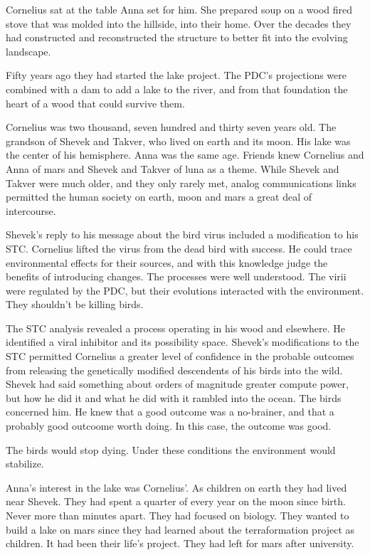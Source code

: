 Cornelius sat at the table Anna set for him.  She prepared soup on a
wood fired stove that was molded into the hillside, into their home.
Over the decades they had constructed and reconstructed the structure
to better fit into the evolving landscape.  

Fifty years ago they had started the lake project.  The PDC's projections
were combined with a dam to add a lake to the river, and from that
foundation the heart of a wood that could survive them.

\bigskip

Cornelius was two thousand, seven hundred and thirty seven years old.
The grandson of Shevek and Takver, who lived on earth and its moon.
His lake was the center of his hemisphere.  Anna was the same age.
Friends knew Cornelius and Anna of mars and Shevek and Takver of luna
as a theme.  While Shevek and Takver were much older, and they only
rarely met, analog communications links permitted the human society on
earth, moon and mars a great deal of intercourse.

\bigskip

Shevek's reply to his message about the bird virus included a
modification to his STC.  Cornelius lifted the virus from the dead
bird with success.  He could trace environmental effects for their
sources, and with this knowledge judge the benefits of introducing
changes.  The processes were well understood.  The virii were
regulated by the PDC, but their evolutions interacted with the
environment.  They shouldn't be killing birds.

The STC analysis revealed a process operating in his wood and
elsewhere.  He identified a viral inhibitor and its possibility space.
Shevek's modifications to the STC permitted Cornelius a greater level
of confidence in the probable outcomes from releasing the genetically
modified descendents of his birds into the wild.  Shevek had said
something about orders of magnitude greater compute power, but how he
did it and what he did with it rambled into the ocean.  The birds
concerned him.  He knew that a good outcome was a no-brainer, and that
a probably good outcoome worth doing.  In this case, the outcome was
good.  

The birds would stop dying.  Under these conditions the environment
would stabilize.

Anna's interest in the lake was Cornelius'.  As children on earth they
had lived near Shevek.  They had spent a quarter of every year on the
moon since birth.  Never more than minutes apart.  They had focused on
biology.  They wanted to build a lake on mars since they had learned
about the terraformation project as children.  It had been their
life's project.  They had left for mars after university.



\bigskip



\bye
